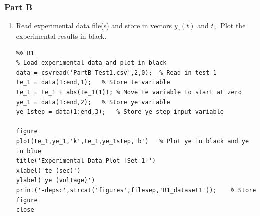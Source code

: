 \documentclass[11pt,a4paper]{article}
\begin{document}
\subsubsection{Part B}
\begin{enumerate}
	\item Read experimental data file(s) and store in vectors $y_e(t)$ and $t_e$. Plot the experimental results in black.
    
    \begin{lstlisting}
%% B1
% Load experimental data and plot in black
data = csvread('PartB_Test1.csv',2,0);  % Read in test 1
te_1 = data(1:end,1);   % Store te variable
te_1 = te_1 + abs(te_1(1)); % Move te variable to start at zero
ye_1 = data(1:end,2);   % Store ye variable
ye_1step = data(1:end,3);   % Store ye step input variable

figure
plot(te_1,ye_1,'k',te_1,ye_1step,'b')   % Plot ye in black and ye in blue
title('Experimental Data Plot [Set 1]')
xlabel('te (sec)')
ylabel('ye (voltage)')
print('-depsc',strcat('figures',filesep,'B1_dataset1'));    % Store figure
close
    \end{lstlisting}

	
    
  \begin{figure}[H]
	

\end{figure}
\end{enumerate}
\end{document}
